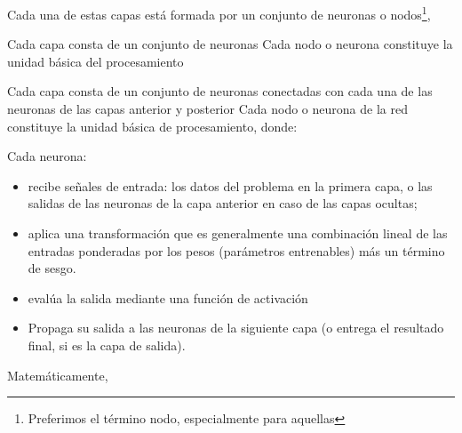 Cada una de estas capas está formada por un conjunto de neuronas o nodos\footnote{Preferimos el término nodo, 
especialmente para aquellas }, 


Cada capa consta de un conjunto de neuronas 
Cada nodo o neurona constituye la unidad básica del procesamiento 

Cada capa consta de un conjunto de neuronas conectadas con cada una de las neuronas de las capas anterior y posterior 
 Cada nodo o neurona de la red constituye la unidad básica de procesamiento, donde:



Cada neurona:

\begin{itemize}

    \item recibe señales de entrada: los datos del problema en la primera capa, o las salidas de las neuronas 
    de la capa anterior en caso de las capas ocultas;

    \item aplica una transformación que es generalmente una combinación lineal de las entradas ponderadas
    por los pesos (parámetros entrenables) más un término de sesgo.

    \item evalúa la salida mediante una función de activación

    \item Propaga su salida a las neuronas de la siguiente capa (o entrega el resultado final, si es la capa de 
    salida).

\end{itemize}

Matemáticamente, 



